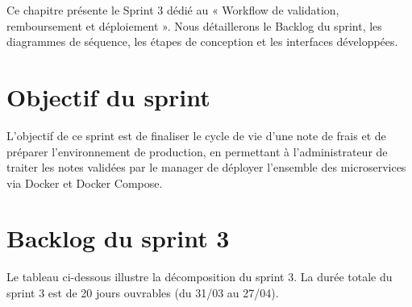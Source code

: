\documentclass[12pt,a4paper]{report}
\begin{document}

Ce chapitre présente le Sprint 3 dédié au « Workflow de validation, remboursement et déploiement ». Nous détaillerons le Backlog du sprint, les diagrammes de séquence, les étapes de conception et les interfaces développées.



\section{Objectif du sprint}

L'objectif de ce sprint est de finaliser le cycle de vie d'une note de frais et de préparer l'environnement de production, en permettant à l'administrateur de traiter les notes validées par le manager de déployer l'ensemble des microservices via Docker et Docker Compose.



\section{Backlog du sprint 3}


Le tableau ci-dessous illustre la décomposition du sprint 3. La durée totale du sprint 3 est de 20 jours ouvrables (du 31/03 au 27/04).


\label{tab:sprint3_combined}
\end{document}
